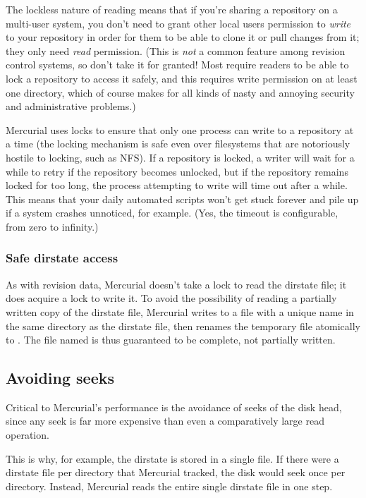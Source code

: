 The lockless nature of reading means that if you're sharing a
repository on a multi-user system, you don't need to grant other local
users permission to \emph{write} to your repository in order for them
to be able to clone it or pull changes from it; they only need
\emph{read} permission.  (This is \emph{not} a common feature among
revision control systems, so don't take it for granted!  Most require
readers to be able to lock a repository to access it safely, and this
requires write permission on at least one directory, which of course
makes for all kinds of nasty and annoying security and administrative
problems.)

Mercurial uses locks to ensure that only one process can write to a
repository at a time (the locking mechanism is safe even over
filesystems that are notoriously hostile to locking, such as NFS).  If
a repository is locked, a writer will wait for a while to retry if the
repository becomes unlocked, but if the repository remains locked for
too long, the process attempting to write will time out after a while.
This means that your daily automated scripts won't get stuck forever
and pile up if a system crashes unnoticed, for example.  (Yes, the
timeout is configurable, from zero to infinity.)

\subsubsection{Safe dirstate access}

As with revision data, Mercurial doesn't take a lock to read the
dirstate file; it does acquire a lock to write it.  To avoid the
possibility of reading a partially written copy of the dirstate file,
Mercurial writes to a file with a unique name in the same directory as
the dirstate file, then renames the temporary file atomically to
.  The file named  is thus
guaranteed to be complete, not partially written.

\subsection{Avoiding seeks}

Critical to Mercurial's performance is the avoidance of seeks of the
disk head, since any seek is far more expensive than even a
comparatively large read operation.

This is why, for example, the dirstate is stored in a single file.  If
there were a dirstate file per directory that Mercurial tracked, the
disk would seek once per directory.  Instead, Mercurial reads the
entire single dirstate file in one step.

